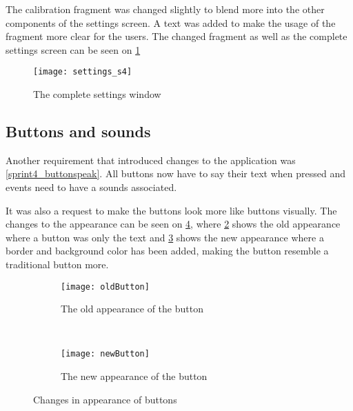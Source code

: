 The calibration fragment was changed slightly to blend more into the other components of the settings screen. 
A text was added to make the usage of the fragment more clear for the users.
The changed fragment as well as the complete settings screen can be seen on \cref{settings_s4}

\begin{figure}
\texttt{[image: settings\_s4]}
\caption{The complete settings window}
\label{settings_s4}
\end{figure}

\subsection{Buttons and sounds}\label{s4_buttonsounds}
Another requirement that introduced changes to the application was \cref{sprint4_buttonspeak}.
All buttons now have to say their text when pressed and events need to have a sounds associated.

It was also a request to make the buttons look more like buttons visually.
The changes to the appearance can be seen on \cref{Buttons}, where \cref{old} shows the old appearance where a button was only the text and \cref{new} shows the new appearance where a border and background color has been added, making the button resemble a traditional button more.

\begin{figure}
\begin{subfigure}{0.5\textwidth}
\centering
\texttt{[image: oldButton]}
\caption{The old appearance of the button}
\label{old}
\end{subfigure}
~
\begin{subfigure}{0.5\textwidth}
\centering
\texttt{[image: newButton]}
\caption{The new appearance of the button}
\label{new}
\end{subfigure}
\caption{Changes in appearance of buttons}
\label{Buttons}
\end{figure}